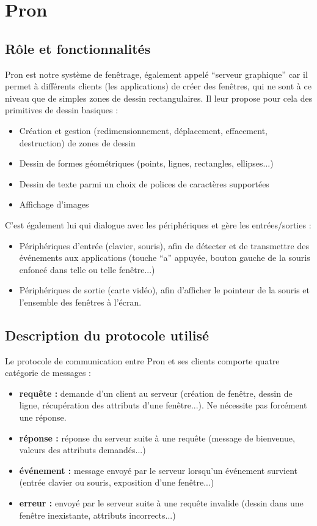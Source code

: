 \section{Pron}

\subsection{Rôle et fonctionnalités}

Pron est notre système de fenêtrage, également appelé ``serveur graphique'' car il permet à différents clients (les applications) de créer des fenêtres, qui ne sont à ce niveau que de simples zones de dessin rectangulaires. Il leur propose pour cela des primitives de dessin basiques :
\begin{itemize}
\item Création et gestion (redimensionnement, déplacement, effacement, destruction) de zones de dessin
\item Dessin de formes géométriques (points, lignes, rectangles, ellipses...)
\item Dessin de texte parmi un choix de polices de caractères supportées
\item Affichage d'images
\end{itemize}

\vspace{1em}

C'est également lui qui dialogue avec les périphériques et gère les entrées/sorties :
\begin{itemize}
  \item Périphériques d'entrée (clavier, souris), afin de détecter et de transmettre des événements aux applications (touche ``a'' appuyée, bouton gauche de la souris enfoncé dans telle ou telle fenêtre...)
  \item Périphériques de sortie (carte vidéo), afin d'afficher le pointeur de la souris et l'ensemble des fenêtres à l'écran.
\end{itemize}

\subsection{Description du protocole utilisé}

Le protocole de communication entre Pron et ses clients comporte quatre catégorie de messages :
\begin{itemize}
  \item \textbf{requête :} demande d'un client au serveur (création de fenêtre, dessin de ligne, récupération des attributs d'une fenêtre...). Ne nécessite pas forcément une réponse.
  \item \textbf{réponse :} réponse du serveur suite à une requête (message de bienvenue, valeurs des attributs demandés...)
  \item \textbf{événement :} message envoyé par le serveur lorsqu'un événement survient (entrée clavier ou souris, exposition d'une fenêtre...)
  \item \textbf{erreur :} envoyé par le serveur suite à une requête invalide (dessin dans une fenêtre inexistante, attributs incorrects...)
\end{itemize}


